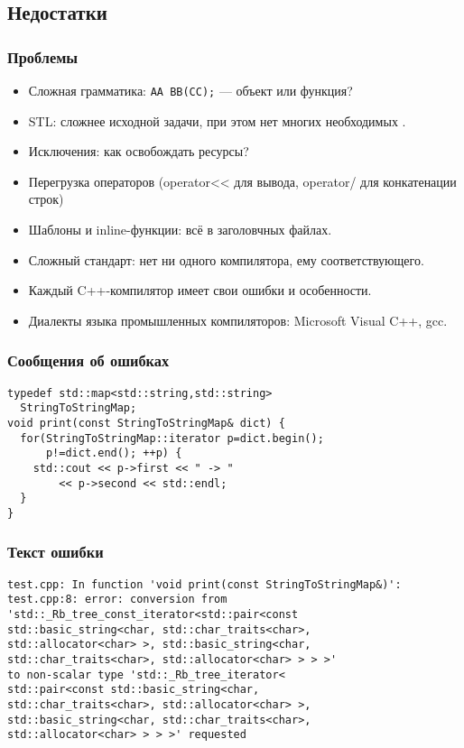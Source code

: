 \documentclass[hyperref={unicode=true}]{beamer}
\begin{document}
\subsection{Недостатки}

\begin{frame}
\frametitle{Проблемы}
\begin{itemize}
\item Сложная грамматика: \texttt{AA BB(CC);} --- объект или функция?
\item STL: сложнее исходной задачи, при этом нет многих необходимых .
\item Исключения: как освобождать ресурсы?
\item Перегрузка операторов (operator<< для вывода, operator/ для
  конкатенации строк)
\item Шаблоны и inline-функции: всё в заголовчных файлах. 
\item Сложный стандарт: нет ни одного компилятора, ему
  соответствующего. 
\item Каждый C++-компилятор имеет свои ошибки и особенности. 
\item Диалекты языка промышленных компиляторов: Microsoft Visual C++,
  gcc. 
\end{itemize}
\end{frame}

\begin{frame}[fragile]
\frametitle{Сообщения об ошибках}
\begin{lstlisting}
typedef std::map<std::string,std::string> 
  StringToStringMap;
void print(const StringToStringMap& dict) {
  for(StringToStringMap::iterator p=dict.begin(); 
      p!=dict.end(); ++p) {
    std::cout << p->first << " -> " 
        << p->second << std::endl;
  }
}
\end{lstlisting}
\end{frame}

\begin{frame}[fragile]
\frametitle{Текст ошибки}
\begin{verbatim}
test.cpp: In function 'void print(const StringToStringMap&)':
test.cpp:8: error: conversion from
'std::_Rb_tree_const_iterator<std::pair<const 
std::basic_string<char, std::char_traits<char>, 
std::allocator<char> >, std::basic_string<char,
std::char_traits<char>, std::allocator<char> > > >' 
to non-scalar type 'std::_Rb_tree_iterator<
std::pair<const std::basic_string<char,
std::char_traits<char>, std::allocator<char> >, 
std::basic_string<char, std::char_traits<char>, 
std::allocator<char> > > >' requested
\end{verbatim}
\end{frame}
\end{document}
